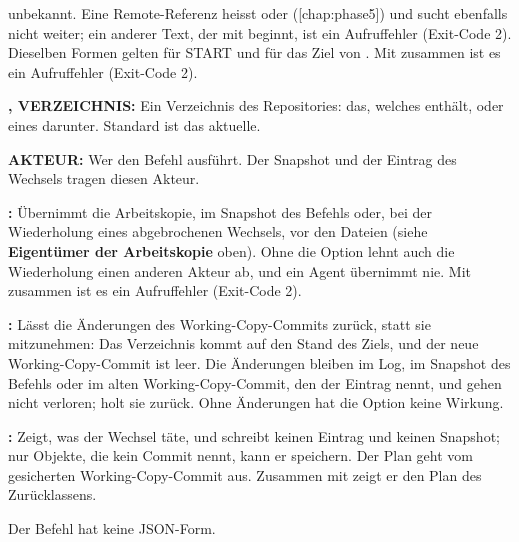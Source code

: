 unbekannt.
Eine Remote-Referenz heisst  oder
 ([chap:phase5]) und sucht ebenfalls nicht weiter;
ein anderer Text, der mit  beginnt, ist ein Aufruffehler (Exit-Code 2).
Dieselben Formen gelten für START und für das Ziel von .
Mit  zusammen ist es ein Aufruffehler (Exit-Code 2).
\item {\bf {},  VERZEICHNIS:} Ein Verzeichnis des Repositories:
das, welches  enthält, oder eines darunter. Standard ist das aktuelle.
\item {\bf {} AKTEUR:} Wer den Befehl ausführt. Der Snapshot und der
Eintrag des Wechsels tragen diesen Akteur.
\item {\bf {}:} Übernimmt die Arbeitskopie, im Snapshot des Befehls oder,
bei der Wiederholung eines abgebrochenen Wechsels, vor den Dateien
(siehe {\bf Eigentümer der Arbeitskopie} oben).
Ohne die Option lehnt auch die Wiederholung einen anderen Akteur ab, und ein Agent übernimmt nie.
Mit  zusammen ist es ein Aufruffehler (Exit-Code 2).
\item {\bf {}:} Lässt die Änderungen des Working-Copy-Commits zurück, statt sie
mitzunehmen: Das Verzeichnis kommt auf den Stand des Ziels, und der neue Working-Copy-Commit ist
leer. Die Änderungen bleiben im Log, im Snapshot des Befehls oder im alten Working-Copy-Commit,
den der Eintrag nennt, und gehen nicht verloren;  holt sie zurück.
Ohne Änderungen hat die Option keine Wirkung.
\item {\bf {}:} Zeigt, was der Wechsel täte, und schreibt keinen Eintrag und keinen
Snapshot; nur Objekte, die kein Commit nennt, kann er speichern.
Der Plan geht vom gesicherten Working-Copy-Commit aus.
Zusammen mit  zeigt er den Plan des Zurücklassens.
\stopitemize

Der Befehl hat keine JSON-Form.

